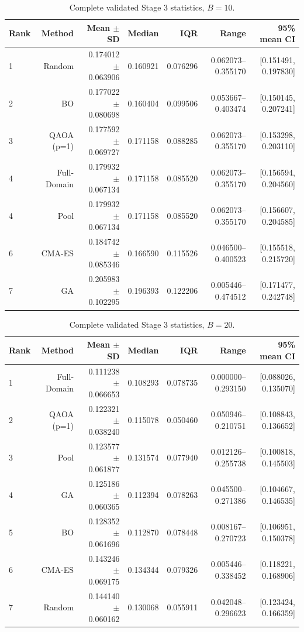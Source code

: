 \begin{table}[htbp]\centering
\caption{Complete validated Stage 3 statistics, $B=10$.}\label{tab:complete10}
\scriptsize
\setlength{\tabcolsep}{4pt}
\begin{tabular}{lrrrrrr}\toprule
Rank & Method & Mean $\pm$ SD & Median & IQR & Range & 95\% mean CI \\ \midrule
1 & Random & 0.174012 $\pm$ 0.063906 & 0.160921 & 0.076296 & 0.062073--0.355170 & [0.151491, 0.197830] \\
2 & BO & 0.177022 $\pm$ 0.080698 & 0.160404 & 0.099506 & 0.053667--0.403474 & [0.150145, 0.207241] \\
3 & QAOA (p=1) & 0.177592 $\pm$ 0.069727 & 0.171158 & 0.088285 & 0.062073--0.355170 & [0.153298, 0.203110] \\
4 & Full-Domain & 0.179932 $\pm$ 0.067134 & 0.171158 & 0.085520 & 0.062073--0.355170 & [0.156594, 0.204560] \\
4 & Pool & 0.179932 $\pm$ 0.067134 & 0.171158 & 0.085520 & 0.062073--0.355170 & [0.156607, 0.204585] \\
6 & CMA-ES & 0.184742 $\pm$ 0.085346 & 0.166590 & 0.115526 & 0.046500--0.400523 & [0.155518, 0.215720] \\
7 & GA & 0.205983 $\pm$ 0.102295 & 0.196393 & 0.122206 & 0.005446--0.474512 & [0.171477, 0.242748] \\
\bottomrule\end{tabular}
\end{table}

\begin{table}[htbp]\centering
\caption{Complete validated Stage 3 statistics, $B=20$.}\label{tab:complete20}
\scriptsize
\setlength{\tabcolsep}{4pt}
\begin{tabular}{lrrrrrr}\toprule
Rank & Method & Mean $\pm$ SD & Median & IQR & Range & 95\% mean CI \\ \midrule
1 & Full-Domain & 0.111238 $\pm$ 0.066653 & 0.108293 & 0.078735 & 0.000000--0.293150 & [0.088026, 0.135070] \\
2 & QAOA (p=1) & 0.122321 $\pm$ 0.038240 & 0.115078 & 0.050460 & 0.050946--0.210751 & [0.108843, 0.136652] \\
3 & Pool & 0.123577 $\pm$ 0.061877 & 0.131574 & 0.077940 & 0.012126--0.255738 & [0.100818, 0.145503] \\
4 & GA & 0.125186 $\pm$ 0.060365 & 0.112394 & 0.078263 & 0.045500--0.271386 & [0.104667, 0.146535] \\
5 & BO & 0.128352 $\pm$ 0.061696 & 0.112870 & 0.078448 & 0.008167--0.270723 & [0.106951, 0.150378] \\
6 & CMA-ES & 0.143246 $\pm$ 0.069175 & 0.134344 & 0.079326 & 0.005446--0.338452 & [0.118221, 0.168906] \\
7 & Random & 0.144140 $\pm$ 0.060162 & 0.130068 & 0.055911 & 0.042048--0.296623 & [0.123424, 0.166359] \\
\bottomrule\end{tabular}
\end{table}

